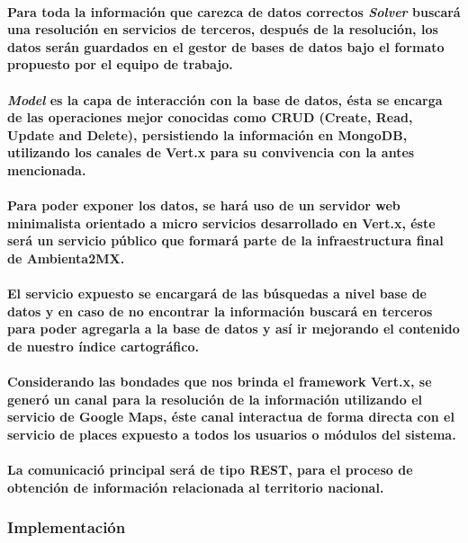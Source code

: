       \paragraph{Para toda la información que carezca de datos correctos \textbf{\emph{Solver}} buscará una resolución en servicios de terceros, después de la resolución, los datos serán guardados en el gestor de bases de datos bajo el formato propuesto por el equipo de trabajo.}
      \paragraph{\textbf{\emph{Model}} es la capa de interacción con la base de datos, ésta se encarga de las operaciones mejor conocidas como CRUD (Create, Read, Update and Delete),  persistiendo la información en MongoDB, utilizando los canales de Vert.x para su convivencia con la antes mencionada.}
      \paragraph{Para poder exponer los datos, se hará uso de un servidor web minimalista orientado a micro servicios desarrollado en Vert.x, éste será un servicio público que formará parte de la infraestructura final de Ambienta2MX.}
      \paragraph{El servicio expuesto se encargará de las búsquedas a nivel base de datos y en caso de no encontrar la información buscará en terceros para poder agregarla a la base de datos y así ir mejorando el contenido de nuestro índice cartográfico.}
      \paragraph{Considerando las bondades que nos brinda el framework Vert.x, se generó un canal para la resolución de la información utilizando el servicio de Google Maps, éste canal interactua de forma directa con el servicio de places expuesto a todos los usuarios o módulos del sistema.}
      \paragraph{La comunicació principal será de tipo REST, para el proceso de 
      obtención de información relacionada al territorio nacional.}
    \subsubsection{Implementación}
